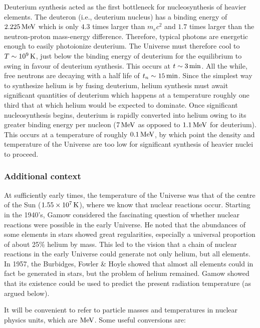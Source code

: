 \documentclass[a4paper,11pt]{article}
\begin{document}
Deuterium synthesis acted as the first bottleneck for nucleosynthesis of heavier elements. The deuteron (i.e., deuterium nucleus) has a binding energy of $2.225\,{\rm MeV}$ which is only $4.3$ times larger than $m_ec^2$ and $1.7$ times larger than the neutron-proton mass-energy difference. Therefore, typical photons are energetic enough to easily photoionize deuterium. The Universe must therefore cool to $T\sim10^9\,{\rm K}$, just below the binding energy of deuterium for the equilibrium to swing in favour of deuterium synthesis. This occurs at $t\sim3\,{\rm min}$. All the while, free neutrons are decaying with a half life of $t_n\sim15\,{\rm min}$. Since the simplest way to synthesize helium is by fusing deuterium, helium synthesis must await significant quantities of deuterium which happens at a temperature roughly one third that at which helium would be expected to dominate. Once significant nucleosynthesis begins, deuterium is rapidly converted into helium owing to its greater binding energy per nucleon ($7\,{\rm MeV}$ as opposed to $1.1\,{\rm MeV}$ for deuterium). This occurs at a temperature of roughly $0.1\,{\rm MeV}$, by which point the density and temperature of the Universe are too low for significant synthesis of heavier nuclei to proceed. 

\subsubsection{Additional context}

{\noindent}At sufficiently early times, the temperature of the Universe was that of the centre of the Sun ($1.55\times10^7\,{\rm K}$), where we know that nuclear reactions occur. Starting in the 1940's, Gamow considered the fascinating question of whether nuclear reactions were possible in the early Universe. He noted that the abundances of some elements in stars showed great regularities, especially a universal proportion of about 25\% helium by mass. This led to the vision that a chain of nuclear reactions in the early Universe could generate not only helium, but all elements. In 1957, the Burbidges, Fowler \& Hoyle showed that almost all elements could in fact be generated in stars, but the problem of helium remained. Gamow showed that its existence could be used to predict the present radiation temperature (as argued below).

{\noindent}It will be convenient to refer to particle masses and temperatures in nuclear physics units, which are ${\rm MeV}$. Some useful conversions are:
\end{document}
